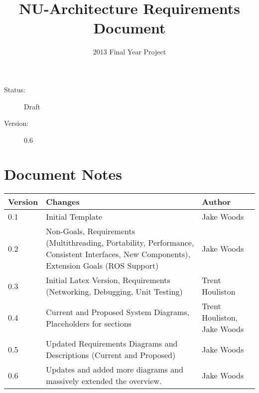 \documentclass[english,12pt]{scrartcl}
\title{NU-Architecture Requirements Document}
\author{2013 Final Year Project}
\begin{document}
    \maketitle
    \vfill
    {\large
        \begin{description}
            \item [Status:] Draft 
            \item [Version:] 0.6
        \end{description}}
 
    \clearpage
    \listoftodos
    \tableofcontents
    \clearpage
 
    \section{Document Notes}
        \begin{tabular}{ p{} | p{} | p{} }
            \textbf{Version} & \textbf{Changes} & \textbf{Author} \\ 
            \hline
            
            0.1 &
            Initial Template &
            Jake Woods \\
            \hline
            
            0.2 &
            Non-Goals, Requirements (Multithreading, Portability, Performance, Consistent
            Interfaces, New Components), Extension Goals (ROS Support) &
            Jake Woods \\
            \hline
            
            0.3 &
            Initial Latex Version, Requirements (Networking, Debugging, Unit Testing) &
            Trent Houliston \\
            \hline
                    
            0.4 &
            Current and Proposed System Diagrams, Placeholders for sections &
            Trent Houliston, Jake Woods \\
            \hline

            0.5 &
            Updated Requirements Diagrams and Descriptions (Current and Proposed) &
            Jake Woods \\
            \hline
            
            0.6 &
            Updates and added more diagrams and massively extended the overview. &
            Jake Woods \\
            \hline
        \end{tabular}
        
\end{document}
